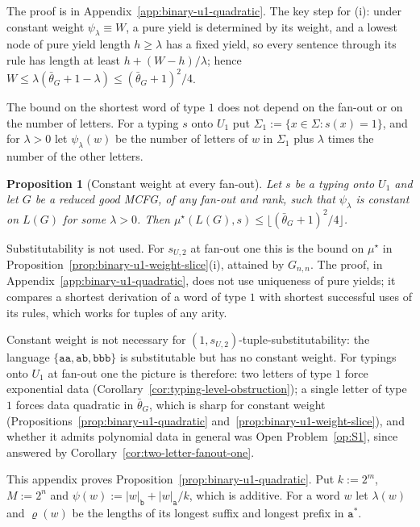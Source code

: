 \documentclass[11pt]{article}
\numberwithin{equation}{section}
\theoremstyle{plain}
\newtheorem{proposition}[theorem]{Proposition}
\theoremstyle{definition}
\theoremstyle{remark}
\theoremstyle{plain}
\begin{document}
The proof is in Appendix~\ref{app:binary-u1-quadratic}.  The key step for (i):
under constant weight $\psi_\lambda\equiv W$, a pure yield is determined by its
weight, and a lowest node of pure yield length $h\ge\lambda$ has a fixed yield, so
every sentence through its rule has length at least $h+(W-h)/\lambda$; hence
$W\le\lambda(\bar\theta_G+1-\lambda)\le(\bar\theta_G+1)^2/4$.


The bound on the shortest word of type $1$ does not depend on the fan-out or on
the number of letters.  For a typing $s$ onto $U_1$ put
$\Sigma_1:=\{x\in\Sigma:s(x)=1\}$, and for $\lambda>0$ let $\psi_\lambda(w)$ be
the number of letters of $w$ in $\Sigma_1$ plus $\lambda$ times the number of the
other letters.

\begin{proposition}[Constant weight at every fan-out]
\label{prop:u1-weight-all-fanout}
Let $s$ be a typing onto $U_1$ and let $G$ be a reduced good MCFG, of any fan-out
and rank, such that $\psi_\lambda$ is constant on $L(G)$ for some $\lambda>0$.
Then $\mu^\star(L(G),s)\le\lfloor(\bar\theta_G+1)^2/4\rfloor$.
\end{proposition}

Substitutability is not used.  For $s_{U,2}$ at fan-out one this is the bound on
$\mu^\star$ in Proposition~\ref{prop:binary-u1-weight-slice}(i), attained by
$G_{n,n}$.  The proof, in Appendix~\ref{app:binary-u1-quadratic}, does not use
uniqueness of pure yields; it compares a shortest derivation of a word of type
$1$ with shortest successful uses of its rules, which works for tuples of any
arity.

Constant weight is not necessary for $(1,s_{U,2})$-tuple-substitutability: the
language $\{\mathtt{aa},\mathtt{ab},\mathtt{bbb}\}$ is substitutable but has no
constant weight.  For typings onto $U_1$ at fan-out one the picture is
therefore: two letters of type $1$ force exponential data
(Corollary~\ref{cor:typing-level-obstruction}); a single letter of type $1$
forces data quadratic in $\bar\theta_G$, which is sharp for constant weight
(Propositions~\ref{prop:binary-u1-quadratic}
and~\ref{prop:binary-u1-weight-slice}), and whether it admits polynomial data
in general was Open Problem~\ref{op:S1}, since answered by Corollary~\ref{cor:two-letter-fanout-one}.


This appendix proves Proposition~\ref{prop:binary-u1-quadratic}.  Put
$k:=2^m$, $M:=2^n$ and $\psi(w):=|w|_{\mathtt b}+|w|_{\mathtt a}/k$, which is
additive.  For a word $w$ let $\lambda(w)$ and $\varrho(w)$ be the lengths of its
longest suffix and longest prefix in $\mathtt a^*$.
\end{document}
